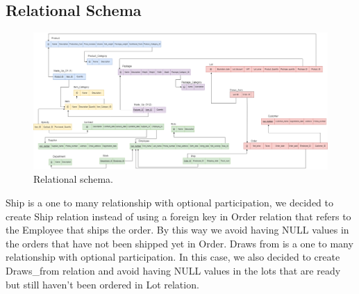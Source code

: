 \subsection{Relational Schema}
\begin{figure}[!h]
	\centering
	\includegraphics[width=1.3\linewidth,angle=270,origin=c]{Relational.png}
	\caption{Relational schema.}
	\label{fig:relational-schema}
\end{figure}
Ship is a one to many relationship with optional participation, we decided to create Ship relation instead of using a foreign key in Order relation that refers to the Employee that ships the order. By this way we avoid having NULL values in the orders that have not been shipped yet in Order.
Draws from is a one to many relationship with optional participation. In this case, we also decided to create Draws_from relation and avoid having NULL  values in the lots that are ready but still haven't been ordered in Lot relation.
